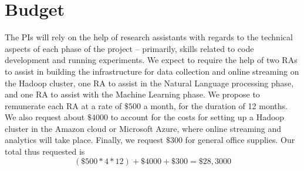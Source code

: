 \section{Budget}

The PIs will rely on the help of research assistants with regards to the technical aspects of each phase of the project -- primarily, skills related to code development and running experiments. We expect to require the help of two RAs to assist in building the infrastructure for data collection and online streaming on the Hadoop cluster, one RA to assist in the Natural Language processing phase, and one RA to assist with the Machine Learning phase. We propose to remunerate each RA at a rate of $\$500$ a month, for the duration of 12 months. We also request about $\$4000$ to account for the costs for setting up a Hadoop cluster in the Amazon cloud or Microsoft Azure, where online streaming and analytics will take place. Finally, we request $\$300$ for general office supplies. Our total thus requested is
\[
(\$500*4*12) + \$4000 + \$300 = \$ 28,3000
\]
